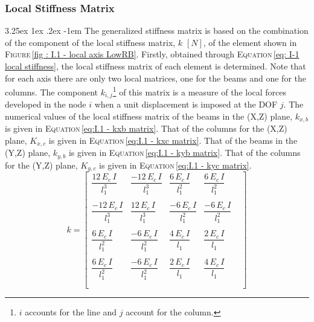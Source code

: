 \documentclass[11pt,a4paper,titlepage]{report}
\makeatletter
\renewcommand\paragraph{\@startsection{paragraph}{5}{\z@}%
  {3.25ex \@plus1ex \@minus.2ex}%
  {-1em}%
  {\normalfont\normalsize\bfseries}}
\makeatother
\begin{document}
\subsubsection{Local Stiffness Matrix}
\paragraph{}The generalized stiffness matrix is based on the combination of the component of the local stiffness matrix, $k$ $[N]$, of the element shown in \textsc{Figure}\,\ref{fig : I.1 - local axis LowRB}. Firstly, obtained through \textsc{Equation}\,\eqref{eq: I-1 local stiffness}, the local stiffness matrix of each element is determined. Note that for each axis there are only two local matrices, one for the beams and one for the columns. The component $k_{i,j}$\footnote{$i$ accounts for the line and $j$ account for the column.} of this matrix is a measure of the local forces developed in the node $i$ when a unit displacement is imposed at the DOF $j$. The numerical values of the local stiffness matrix of the beams in the (X,Z) plane, $k_{x,b}$ is given in \textsc{Equation}\,\eqref{eq:I.1 - kxb matrix}. That of the columns for the (X,Z) plane, $K_{x,c}$ is given in \textsc{Equation}\,\eqref{eq:I.1 - kxc matrix}. That of the beams in the (Y,Z) plane, $k_{y,b}$ is given in \textsc{Equation}\,\eqref{eq:I.1 - kyb matrix}. That of the columns for the (Y,Z) plane, $K_{y,c}$ is given in \textsc{Equation}\,\eqref{eq:I.1 - kyc matrix}.
\begin{equation}
k =
\left[
\begin{matrix}
\dfrac{12\,E_c\,I}{l_1^3} & \dfrac{-12\,E_c\,I}{l_1^3} & \dfrac{6\,E_c\,I}{l_1^2} & \dfrac{6\,E_c\,I}{l_1^2}\\ \\
\dfrac{-12\,E_c\,I}{l_1^3} & \dfrac{12\,E_c\,I}{l_1^3} & \dfrac{-6\,E_c\,I}{l_1^2} & \dfrac{-6\,E_c\,I}{l_1^2}\\ \\
\dfrac{6\,E_c\,I}{l_1^2} & \dfrac{-6\,E_c\,I}{l_1^2} & \dfrac{4\,E_c\,I}{l_1} & \dfrac{2\,E_c\,I}{l_1} & \\ \\
\dfrac{6\,E_c\,I}{l_1^2} & \dfrac{-6\,E_c\,I}{l_1^2} & \dfrac{2\,E_c\,I}{l_1} & \dfrac{4\,E_c\,I}{l_1}\\ \\
\end{matrix}
\right]
\label{eq: I-1 local stiffness}
\end{equation}
\end{document}
